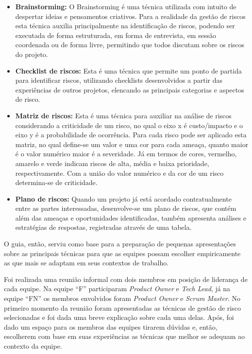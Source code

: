\documentclass[
    12pt,       %
    openright,      %
    twoside,      %
    a4paper,      %
    english,      %
    french,       %
    spanish,      %
    brazil,       %
    ]{abntex2}
\begin{document}
\begin{itemize}
    \item \textbf{Brainstorming:} O Brainstorming é uma técnica utilizada com intuito de despertar ideias e pensamentos criativos. Para a realidade da gestão de riscos esta técnica auxilia principalmente na identificação de riscos, podendo ser executada de forma estruturada, em forma de entrevista, em sessão coordenada ou de forma livre, permitindo que todos discutam sobre os riscos do projeto.
    \item \textbf{Checklist de riscos:} Esta é uma técnica que permite um ponto de partida para identificar riscos, utilizando checklists desenvolvidos a partir das experiências de outros projetos, elencando as principais categorias e aspectos de risco.
    \item \textbf{Matriz de riscos:} Esta é uma técnica para auxiliar na análise de riscos considerando a criticidade de um risco, no qual o eixo x é custo/impacto e o eixo y é a probabilidade de ocorrência. Para cada risco pode ser aplicado esta matriz, no qual define-se um valor e uma cor para cada ameaça, quanto maior é o valor numérico maior é a severidade. Já em termos de cores, vermelho, amarelo e verde indicam riscos de alta, média e baixa prioridade, respectivamente. Com a união do valor numérico e da cor de um risco determina-se de criticidade.
    \item \textbf{Plano de riscos:} Quando um projeto já está acordado contratualmente entre as partes interessadas, desenvolve-se um plano de riscos, que contém além das ameaças e oportunidades identificadas, também apresenta análises e estratégias de respostas, registradas através de uma tabela.
\end{itemize}

O guia, então, serviu como base para a preparação de pequenas apresentações sobre as principais técnicas para que as equipes possam escolher empiricamente as que mais se adaptam em seus contextos de trabalho.

Foi realizada uma reunião informal com dois membros em posição de liderança de cada equipe. Na equipe ``F'' participaram \textit{Product Owner} e \textit{Tech Lead}, já na equipe ``FN'' os membros envolvidos foram \textit{Product Owner} e \textit{Scrum Master}. No primeiro momento da reunião foram apresentadas as técnicas de gestão de risco selecionadas e foi dada uma breve explicação sobre cada uma delas. Após, foi dado um espaço para os membros das equipes tirarem dúvidas e, então, escolherem com base em suas experiências as técnicas que melhor se adequam ao contexto da equipe. 
\end{document}
